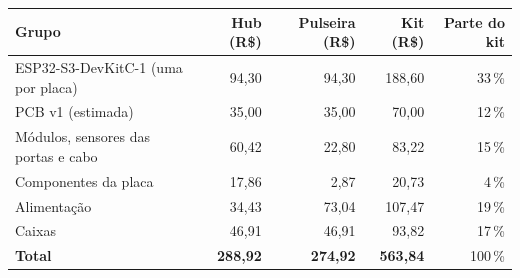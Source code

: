 \begin{tabular}{@{}l r r r r@{}}
\toprule
Grupo & Hub (R\$) & Pulseira (R\$) & Kit (R\$) & Parte do kit \\
\midrule
ESP32-S3-DevKitC-1 (uma por placa) & 94,30 & 94,30 & 188,60 & 33\,\% \\
PCB v1 (estimada) & 35,00 & 35,00 & 70,00 & 12\,\% \\
Módulos, sensores das portas e cabo & 60,42 & 22,80 & 83,22 & 15\,\% \\
Componentes da placa & 17,86 & 2,87 & 20,73 & 4\,\% \\
Alimentação & 34,43 & 73,04 & 107,47 & 19\,\% \\
Caixas & 46,91 & 46,91 & 93,82 & 17\,\% \\
\midrule
\textbf{Total} & \textbf{288,92} & \textbf{274,92} & \textbf{563,84} & 100\,\% \\
\bottomrule
\end{tabular}
